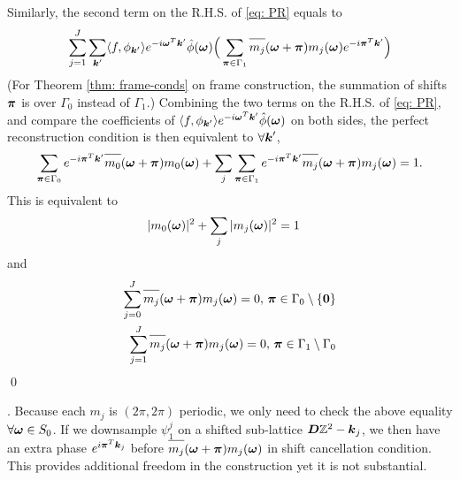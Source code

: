 Similarly, the second term on the R.H.S. of \eqref{eq: PR} equals to 
\begin{align*}
\sum_{j=1}^J\sum_{\V{k}'}\langle f,\phi_{\V{k}'}\rangle e^{-i\V{\omega}^T \V{k}'}\hat{\phi}(\V{\omega})\Big(\sum_{\V{\pi}\in\Gamma_1} \overlinespace{m_j}(\V{\omega}+\V{\pi})m_j(\V{\omega})e^{-i\V{\pi}^T\V{k}'} \Big)
\end{align*}
(For Theorem \ref{thm: frame-conds} on frame construction, the summation of shifts $\boldsymbol{\pi}$ is over $\Gamma_0$ instead of $\Gamma_1$.) 
Combining the two terms on the R.H.S. of \eqref{eq: PR}, and compare the coefficients of $\langle f,\phi_{\boldsymbol{k}'}\rangle e^{-i\boldsymbol{\omega}^T \boldsymbol{k}'}\hat{\phi}(\boldsymbol{\omega})$ on both sides, the perfect reconstruction condition is then equivalent to $\forall \boldsymbol{k}'$,
\begin{align*}
\sum_{\V{\pi}\in\Gamma_0}e^{-i\V{\pi}^T\V{k}'}\overlinespace{m_0}(\V{\omega}+\V{\pi})m_0(\V{\omega}) + \sum_j\sum_{\V{\pi}\in\Gamma_1} e^{-i\V{\pi}^T\V{k}'}\overlinespace{m_j}(\V{\omega}+\V{\pi})m_j(\V{\omega}) = 1. 
\end{align*} 
This is equivalent to 
\begin{align*}
&|m_0(\boldsymbol{\omega})|^2 + \sum_j|m_j(\boldsymbol{\omega})|^2 = 1
\end{align*}
and
\begin{align*}
\sum_{j=0}^J\overlinespace{m_j}(\V{\omega}+\V{\pi})m_j(\V{\omega}) = 0, 
\,\V{\pi}\in \Gamma_0\setminus\{\V{0}\}\\
\sum_{j=1}^J\overlinespace{m_j}(\V{\omega}+\V{\pi})m_j(\V{\omega}) = 0,\,\V{\pi}\in \Gamma_1\setminus \Gamma_0
\end{align*}
\qed

.
Because each $m_j$ is $(2\pi,2\pi)$ periodic, we only need to check the above equality $\forall \boldsymbol{\omega}\in S_0$.
If we downsample $\psi_1^j$ on a shifted sub-lattice $\boldsymbol{D}\mathbb{Z}^2-\boldsymbol{k}_j$, we then have an extra phase $e^{i\boldsymbol{\pi}^T\boldsymbol{k}_j}$ before $\overlinespace{m_j}(\V{\omega}+\V{\pi})m_j(\V{\omega})$ in shift cancellation condition. This provides additional freedom in the construction yet it is not substantial.
